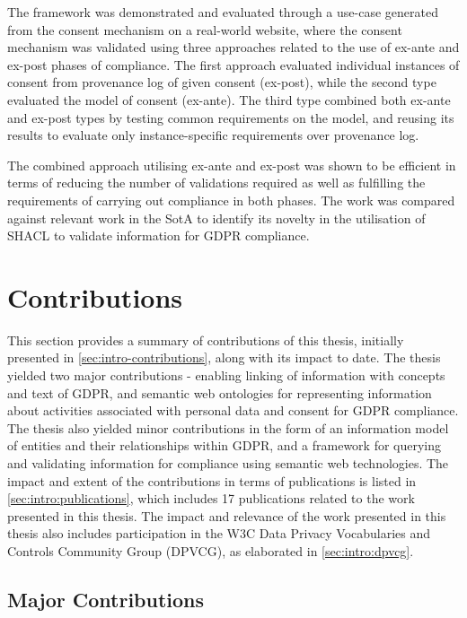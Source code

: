 The framework was demonstrated and evaluated through a use-case generated from the consent mechanism on a real-world website, where the consent mechanism was validated using three approaches related to the use of ex-ante and ex-post phases of compliance.
The first approach evaluated individual instances of consent from provenance log of given consent (ex-post), while the second type evaluated the model of consent (ex-ante). The third type combined both ex-ante and ex-post types by testing common requirements on the model, and reusing its results to evaluate only instance-specific requirements over provenance log.

The combined approach utilising ex-ante and ex-post was shown to be efficient in terms of reducing the number of validations required as well as fulfilling the requirements of carrying out compliance in both phases.
The work was compared against relevant work in the SotA to identify its novelty in the utilisation of SHACL to validate information for GDPR compliance.

\section{Contributions}\label{sec:conclusion-contributions}
This section provides a summary of contributions of this thesis, initially presented in \autoref{sec:intro-contributions}, along with its impact to date. The thesis yielded two major contributions - enabling linking of information with concepts and text of GDPR, and semantic web ontologies for representing information about activities associated with personal data and consent for GDPR compliance. The thesis also yielded minor contributions in the form of an information model of entities and their relationships within GDPR, and a framework for querying and validating information for compliance using semantic web technologies.
The impact and extent of the contributions in terms of publications is listed in \autoref{sec:intro:publications}, which includes 17 publications related to the work presented in this thesis.
The impact and relevance of the work presented in this thesis also includes participation in the W3C Data Privacy Vocabularies and Controls Community Group (DPVCG), as elaborated in \autoref{sec:intro:dpvcg}.

\subsection*{Major Contributions}
